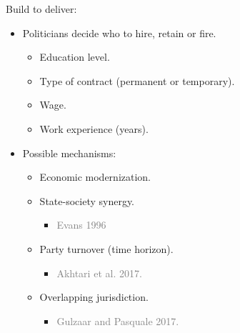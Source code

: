 \documentclass[ignorenonframetext,]{beamer}
\providecommand{\tightlist}{%
  \setlength{\itemsep}{0pt}\setlength{\parskip}{0pt}}
\begin{document}
\begin{frame}{Build to deliver:}

\begin{itemize}[<+->]
\tightlist
\item
  Politicians decide who to hire, retain or fire.

  \begin{itemize}[<+->]
  \tightlist
  \item
    Education level.
  \item
    Type of contract (permanent or temporary).
  \item
    Wage.
  \item
    Work experience (years).
  \end{itemize}
\item
  Possible mechanisms:

  \begin{itemize}[<+->]
  \tightlist
  \item
    Economic modernization.
  \item
    State-society synergy.

    \begin{itemize}[<+->]
    \tightlist
    \item
      \textcolor{gray}{Evans 1996}
    \end{itemize}
  \item
    Party turnover (time horizon).

    \begin{itemize}[<+->]
    \tightlist
    \item
      \textcolor{gray}{Akhtari et al. 2017.}
    \end{itemize}
  \item
    Overlapping jurisdiction.

    \begin{itemize}[<+->]
    \tightlist
    \item
      \textcolor{gray}{Gulzaar and Pasquale 2017.}
    \end{itemize}
  \end{itemize}
\end{itemize}

\end{frame}
\end{document}
